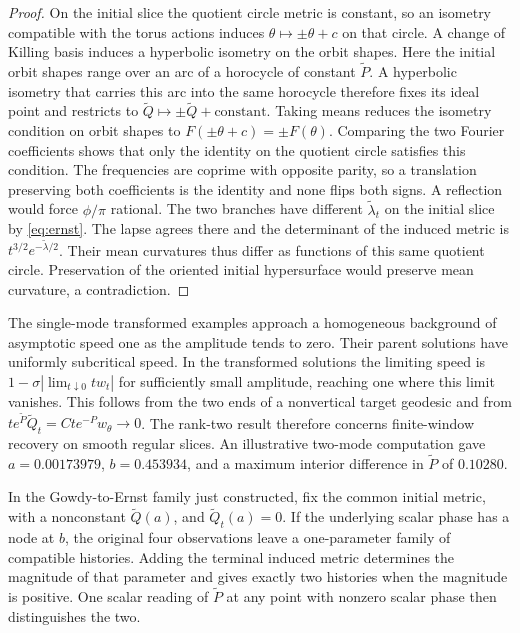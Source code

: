 \begin{proof}
On the initial slice the quotient circle metric is constant,
so an isometry compatible with the torus actions induces
$\theta\mapsto\pm\theta+c$ on that circle. A change of Killing
basis induces a hyperbolic isometry on the orbit shapes. Here
the initial orbit shapes range over an arc of a horocycle
of constant $\widetilde P$. A hyperbolic isometry that
carries this arc into the same horocycle therefore fixes
its ideal point and restricts to
$\widetilde Q\mapsto \pm\widetilde Q+\text{constant}$.
Taking means reduces the isometry condition on orbit shapes
to $F(\pm\theta+c)=\pm F(\theta)$.
Comparing the two Fourier coefficients shows that only the
identity on the quotient circle satisfies this condition.
The frequencies are coprime with opposite parity, so a
translation preserving both coefficients is the identity
and none flips both signs. A reflection would force
$\phi/\pi$ rational.
The two branches have different $\widetilde\lambda_t$
on the initial slice by \eqref{eq:ernst}.
The lapse agrees there and the determinant of the induced
metric is $t^{3/2}e^{-\widetilde\lambda/2}$.
Their mean curvatures thus differ as functions of this same
quotient circle. Preservation of the oriented initial
hypersurface would preserve mean curvature, a contradiction.
\end{proof}

The single-mode transformed examples approach a homogeneous
background of asymptotic speed one as the amplitude tends to
zero. Their parent solutions have uniformly subcritical
speed. In the transformed solutions the limiting speed
is $1-\sigma|\lim_{t\downarrow 0}t w_t|$ for sufficiently
small amplitude, reaching one where this limit vanishes.
This follows from the two ends of a nonvertical target
geodesic and from $t e^{\widetilde P}\widetilde Q_t
=Ct e^{-P}w_\theta\to0$. The rank-two result therefore concerns
finite-window recovery on smooth regular slices.
An illustrative two-mode computation gave $a=0.00173979$,
$b=0.453934$, and a maximum interior difference in
$\widetilde P$ of $0.10280$.

\begin{proposition}
\label{prop:ernst-fiber}
In the Gowdy-to-Ernst family just constructed, fix the common
initial metric, with a nonconstant $\widetilde Q(a)$, and
$\widetilde Q_t(a)=0$. If the underlying scalar phase has a
node at $b$, the original four observations leave a
one-parameter family of compatible histories. Adding the
terminal induced metric determines the magnitude of that
parameter and gives exactly two histories when the magnitude
is positive. One scalar reading of $\widetilde P$ at any
point with nonzero scalar phase then distinguishes the two.
\end{proposition}

